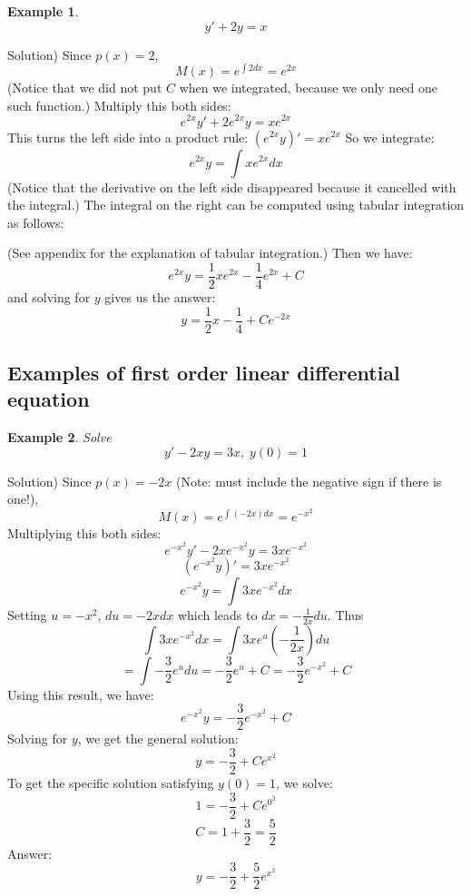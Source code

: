 \documentclass[12pt]{report}
\newtheorem{ex}{Example}[section]
\begin{document}
\begin{ex}
$$y'+2y=x$$
\end{ex}
Solution) Since $p(x)=2$,
$$M(x) = e^{\int 2 dx} = e^{2x}$$
(Notice that we did not put $C$ when we integrated, because we only need one such function.)
Multiply this both sides:
$$e^{2x}y'+2e^{2x}y=xe^{2x}$$
This turns the left side into a product rule:
$\left(e^{2x}y \right)'=xe^{2x}$
So we integrate:
$$e^{2x}y = \int xe^{2x} dx$$
(Notice that the derivative on the left side disappeared because it cancelled with the integral.)
The integral on the right can be computed using tabular integration as follows:
\begin{center}  \end{center}
(See appendix for the explanation of tabular integration.) Then we have:
$$e^{2x}y = \frac{1}{2} x e^{2x} - \frac{1}{4} e^{2x}+C$$
and solving for $y$ gives us the answer:
$$y = \frac{1}{2} x  - \frac{1}{4} +C e^{-2x}$$


\subsection*{ Examples of first order linear differential equation }
\begin{ex} Solve
$$y' - 2xy = 3x,  \; y(0)=1$$
\end{ex}
Solution)
Since $p(x)=-2x$ (Note: must include the negative sign if there is one!),
$$M(x) = e^{\int (-2x) dx} = e^{-x^2}$$
Multiplying this both sides:
$$e^{-x^2}y' - 2xe^{-x^2} y = 3xe^{-x^2}$$
$$\left( e^{-x^2} y \right)' = 3xe^{-x^2}$$
$$ e^{-x^2} y  = \int 3xe^{-x^2} dx $$
Setting $u=-x^2$, $du=-2x dx$ which leads to $dx = -\frac{1}{2x} du$. Thus
$$\int 3xe^{-x^2} dx = \int 3x e^u \left(-\frac{1}{2x}\right) du$$
$$= \int -\frac{3}{2} e^u du = -\frac{3}{2} e^u+C = -\frac{3}{2} e^{-x^2}+C$$
Using this result, we have:
$$ e^{-x^2} y  =-\frac{3}{2} e^{-x^2}+C $$
Solving for $y$, we get the general solution:
$$ y = -\frac{3}{2}+ C e^{x^2} $$
To get the specific solution satisfying $y(0)=1$, we solve:
$$1= -\frac{3}{2}+ C e^{0^2}$$
$$C= 1+\frac{3}{2}=\frac{5}{2}$$
Answer:
$$y = -\frac{3}{2}+ \frac{5}{2} e^{x^2} $$
\end{document}
